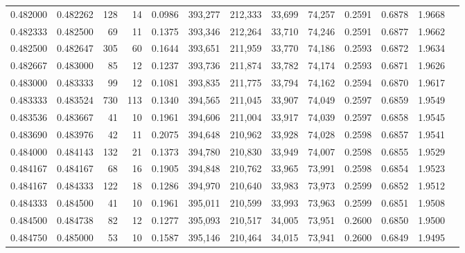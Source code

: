 \begin{tabular}{rrrrrrrrrrrrr}
0.482000 & 0.482262 &   128 &  14 &                                     0.0986 & 393,277 & 212,333 &  33,699 &  74,257 & 0.2591 & 0.6878 & 1.9668 \\
0.482333 & 0.482500 &    69 &  11 &                                     0.1375 & 393,346 & 212,264 &  33,710 &  74,246 & 0.2591 & 0.6877 & 1.9662 \\
0.482500 & 0.482647 &   305 &  60 &                                     0.1644 & 393,651 & 211,959 &  33,770 &  74,186 & 0.2593 & 0.6872 & 1.9634 \\
0.482667 & 0.483000 &    85 &  12 &                                     0.1237 & 393,736 & 211,874 &  33,782 &  74,174 & 0.2593 & 0.6871 & 1.9626 \\
0.483000 & 0.483333 &    99 &  12 &                                     0.1081 & 393,835 & 211,775 &  33,794 &  74,162 & 0.2594 & 0.6870 & 1.9617 \\
0.483333 & 0.483524 &   730 & 113 &                                     0.1340 & 394,565 & 211,045 &  33,907 &  74,049 & 0.2597 & 0.6859 & 1.9549 \\
0.483536 & 0.483667 &    41 &  10 &                                     0.1961 & 394,606 & 211,004 &  33,917 &  74,039 & 0.2597 & 0.6858 & 1.9545 \\
0.483690 & 0.483976 &    42 &  11 &                                     0.2075 & 394,648 & 210,962 &  33,928 &  74,028 & 0.2598 & 0.6857 & 1.9541 \\
0.484000 & 0.484143 &   132 &  21 &                                     0.1373 & 394,780 & 210,830 &  33,949 &  74,007 & 0.2598 & 0.6855 & 1.9529 \\
0.484167 & 0.484167 &    68 &  16 &                                     0.1905 & 394,848 & 210,762 &  33,965 &  73,991 & 0.2598 & 0.6854 & 1.9523 \\
0.484167 & 0.484333 &   122 &  18 &                                     0.1286 & 394,970 & 210,640 &  33,983 &  73,973 & 0.2599 & 0.6852 & 1.9512 \\
0.484333 & 0.484500 &    41 &  10 &                                     0.1961 & 395,011 & 210,599 &  33,993 &  73,963 & 0.2599 & 0.6851 & 1.9508 \\
0.484500 & 0.484738 &    82 &  12 &                                     0.1277 & 395,093 & 210,517 &  34,005 &  73,951 & 0.2600 & 0.6850 & 1.9500 \\
0.484750 & 0.485000 &    53 &  10 &                                     0.1587 & 395,146 & 210,464 &  34,015 &  73,941 & 0.2600 & 0.6849 & 1.9495 \\

\end{tabular}
